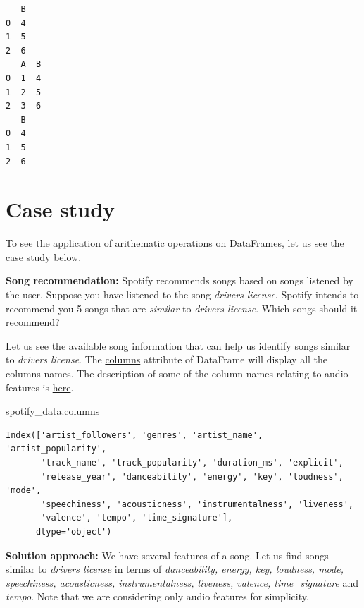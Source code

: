 \documentclass[
  letterpaper,
  DIV=11,
  numbers=noendperiod]{scrreprt}
\newenvironment{Shaded}{\begin{snugshade}}{\end{snugshade}}
\newcommand{\NormalTok}[1]{\textcolor[rgb]{0.00,0.23,0.31}{#1}}
\begin{document}
\begin{verbatim}
   B
0  4
1  5
2  6
   A  B
0  1  4
1  2  5
2  3  6
   B
0  4
1  5
2  6
\end{verbatim}

\hypertarget{case-study}{%
\section{Case study}\label{case-study}}

To see the application of arithematic operations on DataFrames, let us
see the case study below.

\textbf{Song recommendation:} Spotify recommends songs based on songs
listened by the user. Suppose you have listened to the song
\emph{drivers license}. Spotify intends to recommend you 5 songs that
are \emph{similar} to \emph{drivers license}. Which songs should it
recommend?

Let us see the available song information that can help us identify
songs similar to \emph{drivers license}. The
\href{https://pandas.pydata.org/docs/reference/api/pandas.DataFrame.columns.html}{columns}
attribute of DataFrame will display all the columns names. The
description of some of the column names relating to audio features is
\href{https://developer.spotify.com/documentation/web-api/reference/\#/operations/get-audio-features}{here}.

\begin{Shaded}
\begin{Highlighting}[]
\NormalTok{spotify\_data.columns}
\end{Highlighting}
\end{Shaded}

\begin{verbatim}
Index(['artist_followers', 'genres', 'artist_name', 'artist_popularity',
       'track_name', 'track_popularity', 'duration_ms', 'explicit',
       'release_year', 'danceability', 'energy', 'key', 'loudness', 'mode',
       'speechiness', 'acousticness', 'instrumentalness', 'liveness',
       'valence', 'tempo', 'time_signature'],
      dtype='object')
\end{verbatim}

\textbf{Solution approach:} We have several features of a song. Let us
find songs similar to \emph{drivers license} in terms of
\emph{danceability, energy, key, loudness, mode, speechiness,
acousticness, instrumentalness, liveness, valence, time\_signature} and
\emph{tempo}. Note that we are considering only audio features for
simplicity.
\end{document}
